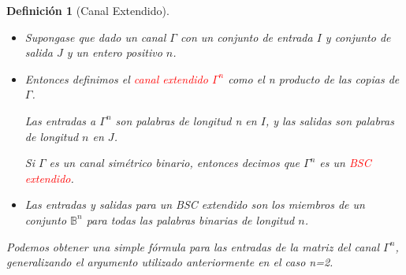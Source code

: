 \documentclass{beamer}
\theoremstyle{plain}
\newtheorem{definicion} [Definicion]{Definición}
\theoremstyle{example}
\theoremstyle{example}
\begin{document}
\begin{frame}  \small  

\begin{definicion}[Canal Extendido]
\begin{itemize} 

\item 
Supongase que dado un canal $\Gamma$ con un conjunto de entrada $I$ y conjunto de salida $J$ y un entero positivo $n$.

\item
Entonces definimos el \textcolor{red}{canal extendido $\Gamma^n$} como el n producto de las copias de $\Gamma$.  

Las entradas a  $\Gamma^n$ son palabras de longitud n en $I$, y las salidas son palabras de longitud $n$ en $J$. 

Si $\Gamma$ es un canal simétrico binario, entonces decimos que $\Gamma^n$ es un \textcolor{red}{BSC extendido}.

\item
Las entradas y salidas para un BSC extendido son los miembros de un conjunto $\mathbb{B}^n$ para todas las palabras binarias de longitud $n$. 

\end{itemize}

Podemos obtener una simple fórmula para las entradas de la matriz del canal $\Gamma^n$, generalizando el argumento utilizado anteriormente en el caso n=2. 

\end{definicion}
 \end{frame} 
\end{document}
